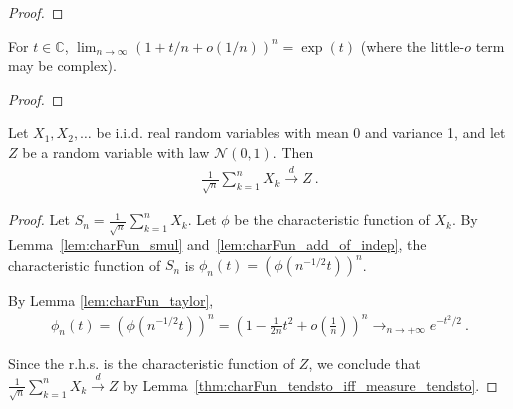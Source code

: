 \begin{proof}\leanok
{}
\end{proof}

\begin{lemma}\label{lem:tendsto_one_plus_div_pow_exp}
\leanok
{}
For $t\in\mathbb{C}$, $\lim_{n\to\infty}(1+t/n+o(1/n))^n=\exp(t)$ (where the little-$o$ term may be complex).
\end{lemma}

\begin{proof}\leanok
\end{proof}

\begin{theorem}\label{clt}
    \leanok
Let $X_1, X_2, \ldots$ be i.i.d. real random variables with mean 0 and variance 1, and let $Z$ be a random variable with law $\mathcal N(0,1)$. Then
\begin{align*}
\frac{1}{\sqrt{n}}\sum_{k=1}^n X_k \xrightarrow{d} Z \: .
\end{align*}
\end{theorem}

\begin{proof}
\leanok
Let $S_n = \frac{1}{\sqrt{n}}\sum_{k=1}^n X_k$. Let $\phi$ be the characteristic function of $X_k$. By Lemma~\ref{lem:charFun_smul} and~\ref{lem:charFun_add_of_indep}, the characteristic function of $S_n$ is $\phi_n(t) = (\phi(n^{-1/2}t))^n$.

By Lemma \ref{lem:charFun_taylor},
\begin{align*}
\phi_n(t) = (\phi(n^{-1/2}t))^n = \left(1 - \frac{1}{2n}t^2 + o(\frac{1}{n})\right)^n \to_{n \to +\infty} e^{-t^2/2} \: .
\end{align*}

Since the r.h.s. is the characteristic function of $Z$, we conclude that $\frac{1}{\sqrt{n}}\sum_{k=1}^n X_k \xrightarrow{d} Z$ by Lemma~\ref{thm:charFun_tendsto_iff_measure_tendsto}.
\end{proof}
